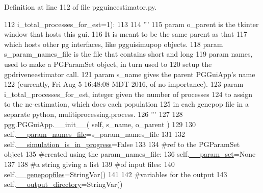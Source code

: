 Definition at line 112 of file pgguineestimator.\+py.


\begin{DoxyCode}
112                         i\_total\_processes\_for\_est=1):
113 
114         \textcolor{stringliteral}{'''}
115 \textcolor{stringliteral}{        param o\_parent is the tkinter window that hosts this gui.  }
116 \textcolor{stringliteral}{            It is meant to be the same parent as that }
117 \textcolor{stringliteral}{            which hosts other pg interfaces, like pgguisimupop objects.}
118 \textcolor{stringliteral}{        param s\_param\_names\_file is the file that contains short and long }
119 \textcolor{stringliteral}{            param names, used to make a PGParamSet object, in turn used to }
120 \textcolor{stringliteral}{            setup the gpdriveneestimator call.}
121 \textcolor{stringliteral}{        param s\_name gives the parent PGGuiApp's name }
122 \textcolor{stringliteral}{            (currently, Fri Aug  5 16:48:08 MDT 2016, of no importance).}
123 \textcolor{stringliteral}{        param i\_total\_processes\_for\_est, integer given the number of processes }
124 \textcolor{stringliteral}{            to assign to the ne-estimation, which does each population }
125 \textcolor{stringliteral}{            in each genepop file in a separate python, mulitiprocessing.process.}
126 \textcolor{stringliteral}{        '''}
127                 
128         pgg.PGGuiApp.\_\_init\_\_( self, s\_name, o\_parent )
129 
130         self.\hyperlink{classnegui_1_1pgguineestimator_1_1PGGuiNeEstimator_ad43141babe70a961822e084eb5135694}{\_\_param\_names\_file}=s\_param\_names\_file
131 
132         self.\hyperlink{classnegui_1_1pgguineestimator_1_1PGGuiNeEstimator_a023d91ae2644093f73224e4e888b4fda}{\_\_simulation\_is\_in\_progress}=\textcolor{keyword}{False}
133 
134         \textcolor{comment}{#ref to the PGParamSet object}
135         \textcolor{comment}{#created using the param\_names\_file:}
136         self.\hyperlink{classnegui_1_1pgguineestimator_1_1PGGuiNeEstimator_ac2bd76cb672864ff2e2a130e5834fda5}{\_\_param\_set}=\textcolor{keywordtype}{None}
137         
138         \textcolor{comment}{#a string giving a list }
139         \textcolor{comment}{#of input files:}
140         self.\hyperlink{classnegui_1_1pgguineestimator_1_1PGGuiNeEstimator_a3099d8da5e8d1bbc9d82eb8b4b2faae3}{\_\_genepopfiles}=StringVar()
141 
142         \textcolor{comment}{#variables for the output}
143         self.\hyperlink{classnegui_1_1pgguineestimator_1_1PGGuiNeEstimator_a0417612089ced13dd306ab5fbcb62868}{\_\_output\_directory}=StringVar()

\end{DoxyCode}
